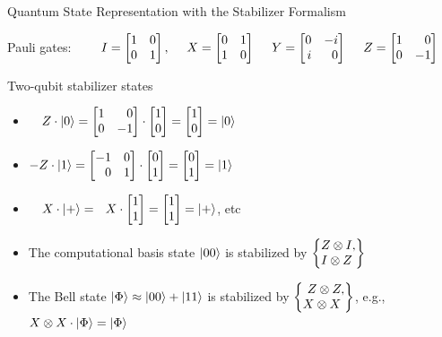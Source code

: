 \begin{frame}{Quantum State Representation with the
					\alert{Stabilizer Formalism}}


\vspace{-.5em}
Pauli gates:~~~~ $I = \mat{1&0\\0&1},~~~~X = \mat{0&1\\1&0} ~~~~Y = \mat{0&-i\\i&0}~~~~Z = \mat{1&0\\0&-1}$


\begin{exampleblock}{Two-qubit stabilizer states}

\begin{itemize}
\item ~~$Z \cdot \ket{0} = \mat{1&0\\0&-1} \cdot \mat{1\\0} = \mat{1\\0} = \ket 0$
\item $-Z \cdot \ket{1} = \mat{-1&0\\0&1} \cdot \mat{0\\1} = \mat{0\\1} = \ket 1$
\pause
\item
{}
\pause
 ~~$X \cdot \ket{+} = ~~X \cdot \mat{1\\1} = \mat{1\\1} = \ket +$, etc
\pause
\vspace{-.5em}
	\item The computational basis state $\ket{00}$ is stabilized by $\left\{\amat{Z\otimes I,\\ I\otimes Z\phantom,}\right\}$
	\item The Bell state $
    \ket{\Phi} \approx  \ket{00} + \ket{11}
$ is stabilized by $\left\{\amat{Z\otimes Z,\\ X\otimes X\phantom,}\right\}$, \pause e.g., $X\otimes X \cdot \ket{\Phi} = \ket{\Phi}$
\end{itemize}





\end{exampleblock}
\end{frame}
